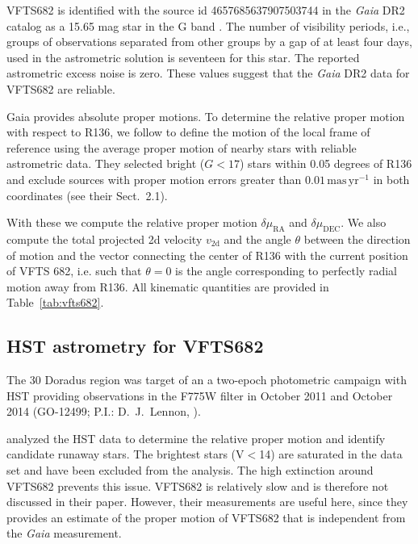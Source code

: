 \documentclass[apjl,twocolumn]{emulateapj}
\newcommand{\masyr}{\,\mathrm{mas}\,\mathrm{yr}^{-1}}
\DeclareRobustCommand{\Tabref}[1]{Table~\ref{#1}}
\begin{document}
VFTS682 is identified with the source id 4657685637907503744 in the
\emph{Gaia} DR2 catalog %
  as a 15.65 mag star in the G band
\citep{gaia:16,brown:18}.   The number of visibility periods,
i.e., groups of observations separated from other groups by a gap of at
least four days, used in the astrometric solution is seventeen for this
star. The reported astrometric excess noise is zero.  These values
suggest that the \emph{Gaia} DR2  data for VFTS682 are
reliable.

Gaia provides absolute proper motions.  To determine the relative
proper motion with respect to R136, we follow  \citet{lennon:18} to
define the motion of the local frame of reference using the average
proper motion of nearby stars with reliable astrometric data.  They
selected bright ($G<17$) stars within 0.05 degrees of R136 and exclude sources with proper motion errors greater than $0.01\masyr$ in both coordinates (see their  Sect.~2.1).  

With these we compute the relative proper motion
$\delta\mu_\mathrm{RA}$ and $\delta\mu_\mathrm{DEC}$.   We also compute the total projected 2d velocity
$v_\mathrm{2d}$ and
the angle $\theta$ between the direction of motion and the vector
connecting the center of R136 with the current position of VFTS 682,
i.e. such that $\theta = 0$ is the angle corresponding to perfectly
radial motion away from R136. All kinematic quantities are provided in
\Tabref{tab:vfts682}. 



\subsection{HST astrometry for VFTS682}

The 30 Doradus region was target of an a two-epoch photometric campaign with HST providing observations in the F775W filter in October 2011 and October 2014 (GO-12499; P.I.: D.~J.~Lennon, \citealt{sabbi:13}). %

\citet{platais:15, platais:18} analyzed the HST data to determine the
relative proper motion and identify candidate runaway stars. The
brightest stars (V$<$14) are saturated in the data set and have been
excluded from the analysis. The high extinction around VFTS682
prevents this issue. %
VFTS682 is relatively slow and is therefore not discussed in their paper.  However, their measurements are useful here, since they provides an  estimate of the proper motion of VFTS682 that is independent from the \emph{Gaia} measurement. 
 
\end{document}
